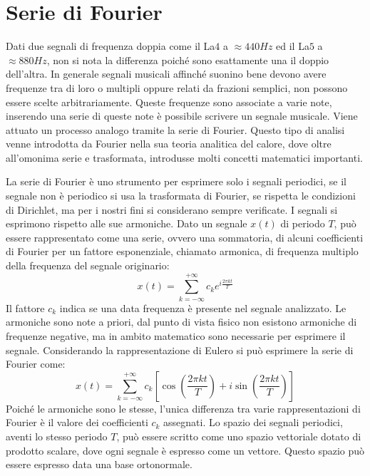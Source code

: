 \documentclass{article}
\numberwithin{equation}{subsection}
\begin{document}
\clearpage

\section{Serie di Fourier}

Dati due segnali di frequenza doppia come il La$4$ a $\approx 440Hz$ ed il La$5$ a $\approx 880Hz$, non si nota la differenza poiché sono esattamente una il doppio dell'altra. 
In generale segnali musicali affinché suonino bene devono avere frequenze tra di loro o multipli oppure relati da frazioni semplici, non possono essere scelte arbitrariamente. 
Queste frequenze sono associate a varie note, inserendo una serie di queste note è possibile scrivere un segnale musicale. Viene attuato un processo analogo tramite la serie di 
Fourier. Questo tipo di analisi venne introdotta da Fourier nella sua teoria analitica del calore, dove oltre all'omonima serie e trasformata, introdusse molti concetti 
matematici importanti. 



La serie di Fourier è uno strumento per esprimere solo i segnali periodici, 
se il segnale non è periodico si usa la trasformata di Fourier, se rispetta le condizioni di Dirichlet, ma per i nostri fini si considerano sempre verificate. 
I segnali si esprimono rispetto alle sue armoniche. Dato un segnale $x(t)$ di periodo $T$, può essere rappresentato come una serie, ovvero una sommatoria, di alcuni 
coefficienti di Fourier per un fattore esponenziale, chiamato armonica, di frequenza multiplo della frequenza del segnale originario:
\begin{equation}
    x(t)=\displaystyle\sum_{k=-\infty}^{+\infty}c_ke^{i\frac{2\pi  k t}{T}}
\end{equation}
Il fattore $c_k$ indica se una data frequenza è presente nel segnale analizzato. Le armoniche sono note a priori, dal punto di vista fisico non esistono armoniche di frequenze 
negative, ma in ambito matematico sono necessarie per esprimere il segnale. Considerando la rappresentazione di Eulero si può esprimere la serie di Fourier come:
\begin{equation}
    x(t)=\displaystyle\sum_{k=-\infty}^{+\infty}c_k\left[\cos\left(\frac{2\pi k t}{T}\right)+i\sin\left(\frac{2\pi k t}{T}\right)\right]
\end{equation}
Poiché le armoniche sono le stesse, l'unica differenza tra varie rappresentazioni di Fourier è il valore dei coefficienti $c_k$ assegnati. Lo spazio dei segnali periodici, 
aventi lo stesso periodo $T$, può essere scritto come uno spazio vettoriale dotato di prodotto scalare, dove ogni segnale è espresso come un vettore. Questo spazio può essere 
espresso data una base ortonormale.
\end{document}
